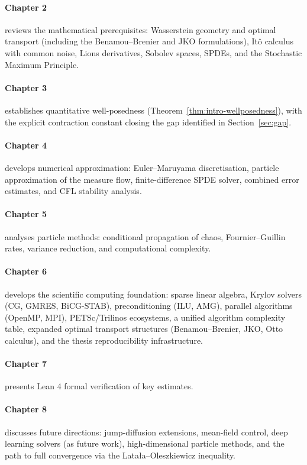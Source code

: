\paragraph{Chapter 2} reviews the mathematical prerequisites: Wasserstein geometry
and optimal transport (including the Benamou--Brenier and JKO formulations),
It\^{o} calculus with common noise, Lions derivatives, Sobolev spaces, SPDEs,
and the Stochastic Maximum Principle.

\paragraph{Chapter 3} establishes quantitative well-posedness (Theorem~\ref{thm:intro-wellposedness}),
with the explicit contraction constant closing the gap identified in Section~\ref{sec:gap}.

\paragraph{Chapter 4} develops numerical approximation: Euler--Maruyama discretisation,
particle approximation of the measure flow, finite-difference SPDE solver, combined
error estimates, and CFL stability analysis.

\paragraph{Chapter 5} analyses particle methods: conditional propagation of chaos,
Fournier--Guillin rates, variance reduction, and computational complexity.

\paragraph{Chapter 6} develops the scientific computing foundation: sparse linear
algebra, Krylov solvers (CG, GMRES, BiCG-STAB), preconditioning (ILU, AMG),
parallel algorithms (OpenMP, MPI), PETSc/Trilinos ecosystems, a unified algorithm
complexity table, expanded optimal transport structures (Benamou--Brenier, JKO,
Otto calculus), and the thesis reproducibility infrastructure.

\paragraph{Chapter 7} presents Lean 4 formal verification of key estimates.

\paragraph{Chapter 8} discusses future directions: jump-diffusion extensions,
mean-field control, deep learning solvers (as future work), high-dimensional
particle methods, and the path to full convergence via the Lata\l{}a--Oleszkiewicz
inequality.

